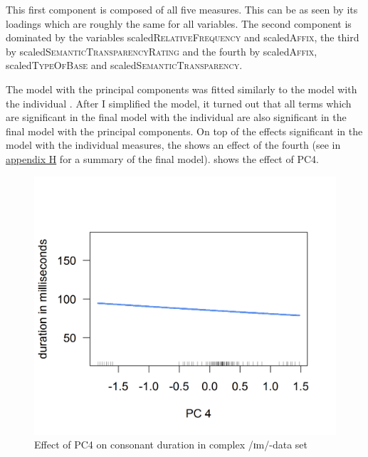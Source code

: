This first component is composed of all five measures. This can be as seen by its loadings which are roughly the same for all variables. The second component is dominated by the variables scaled\textsc{RelativeFrequency} and scaled\textsc{Affix}, the third by scaled\textsc{SemanticTransparencyRating} and the fourth by scaled\textsc{Affix}, scaled\textsc{TypeOfBase} and scaled\textsc{SemanticTransparency}. 


The model with the principal components was fitted similarly to the model with the individual . After I simplified the model, it turned out that all terms which are significant in the final model with the individual  are also significant in the final model with the principal components. On top of the effects significant in the model with the individual measures, the  shows an effect of the fourth  (see  in \hyperref[Appendix H: Model Summaries Experiment]{appendix H} for a summary of the final model).  shows the effect of \textsc{PC4}.

\begin{figure} 
	

	\includegraphics [scale=0.5] {images/Experiment/imModelPC}
	\caption{Effect of PC4 on consonant duration in complex /ɪm/-data set}
	\label{fig:PC 4 imComplex experiment}

\end{figure}


